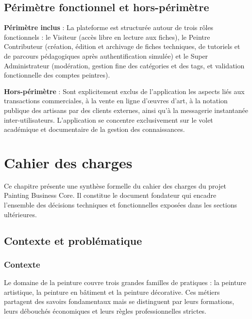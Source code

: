 \documentclass[12pt,a4paper]{report}
\begin{document}
\subsection*{Périmètre fonctionnel et hors-périmètre}

\textbf{Périmètre inclus} : La plateforme est structurée autour de trois rôles fonctionnels : le Visiteur (accès libre en lecture aux fiches), le Peintre Contributeur (création, édition et archivage de fiches techniques, de tutoriels et de parcours pédagogiques après authentification simulée) et le Super Administrateur (modération, gestion fine des catégories et des tags, et validation fonctionnelle des comptes peintres).

\textbf{Hors-périmètre} : Sont explicitement exclus de l'application les aspects liés aux transactions commerciales, à la vente en ligne d'œuvres d'art, à la notation publique des artisans par des clients externes, ainsi qu'à la messagerie instantanée inter-utilisateurs. L'application se concentre exclusivement sur le volet académique et documentaire de la gestion des connaissances.

\newpage

\section{Cahier des charges}

Ce chapitre présente une synthèse formelle du cahier des charges du projet Painting Business Core. Il constitue le document fondateur qui encadre l'ensemble des décisions techniques et fonctionnelles exposées dans les sections ultérieures.

\subsection{Contexte et problématique}

\subsubsection*{Contexte}

Le domaine de la peinture couvre trois grandes familles de pratiques : la peinture artistique, la peinture en bâtiment et la peinture décorative. Ces métiers partagent des savoirs fondamentaux mais se distinguent par leurs formations, leurs débouchés économiques et leurs règles professionnelles strictes.
\end{document}
